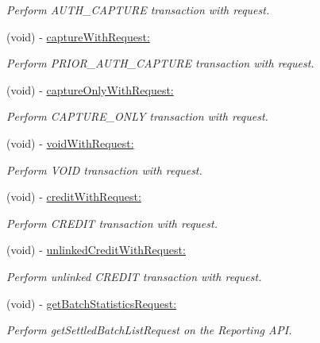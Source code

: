 \begin{DoxyCompactItemize}
\begin{DoxyCompactList}\small\item\em Perform AUTH\_\-CAPTURE transaction with request. \item\end{DoxyCompactList}\item 
(void) -\/ \hyperlink{interface_auth_net_a6a586e0765c774199ccecbebdf072d3d}{captureWithRequest:}
\begin{DoxyCompactList}\small\item\em Perform PRIOR\_\-AUTH\_\-CAPTURE transaction with request. \item\end{DoxyCompactList}\item 
(void) -\/ \hyperlink{interface_auth_net_a5d2e5d9f91f57cf1ea72a8f091aebf2d}{captureOnlyWithRequest:}
\begin{DoxyCompactList}\small\item\em Perform CAPTURE\_\-ONLY transaction with request. \item\end{DoxyCompactList}\item 
(void) -\/ \hyperlink{interface_auth_net_aef8d13917d406c5056a2176817562260}{voidWithRequest:}
\begin{DoxyCompactList}\small\item\em Perform VOID transaction with request. \item\end{DoxyCompactList}\item 
(void) -\/ \hyperlink{interface_auth_net_a95bc4a5faa7ce40df5295837b98617b3}{creditWithRequest:}
\begin{DoxyCompactList}\small\item\em Perform CREDIT transaction with request. \item\end{DoxyCompactList}\item 
(void) -\/ \hyperlink{interface_auth_net_a5b2bc486ff67a6f7fd8c8708c89057a0}{unlinkedCreditWithRequest:}
\begin{DoxyCompactList}\small\item\em Perform unlinked CREDIT transaction with request. \item\end{DoxyCompactList}\item 
(void) -\/ \hyperlink{interface_auth_net_a46d75652309982e05c800901ac86e5eb}{getBatchStatisticsRequest:}
\begin{DoxyCompactList}\small\item\em Perform getSettledBatchListRequest on the Reporting API. \item\end{DoxyCompactList}\item 

\end{DoxyCompactItemize}
